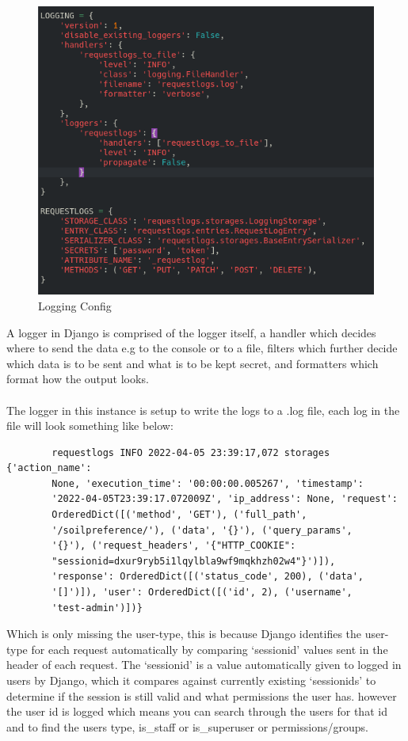 \documentclass{article}
\begin{document}
    \begin{figure}[!htb]
        \caption{Logging Config}
        \includegraphics{log3}
    \end{figure}

    A logger in Django is comprised of the logger itself, a handler which decides where to send the data e.g to the console or to a file, filters which further decide which data is to be sent and what is to be kept secret, and formatters which format how the output looks.
    \\
    \\
    The logger in this instance is setup to write the logs to a .log file,
    each log in the file will look something like below:
    
    \begin{verbatim}
        requestlogs INFO 2022-04-05 23:39:17,072 storages {'action_name':
        None, 'execution_time': '00:00:00.005267', 'timestamp':
        '2022-04-05T23:39:17.072009Z', 'ip_address': None, 'request':
        OrderedDict([('method', 'GET'), ('full_path',
        '/soilpreference/'), ('data', '{}'), ('query_params',
        '{}'), ('request_headers', '{"HTTP_COOKIE":
        "sessionid=dxur9ryb5i1lqylbla9wf9mqkhzh02w4"}')]),
        'response': OrderedDict([('status_code', 200), ('data',
        '[]')]), 'user': OrderedDict([('id', 2), ('username',
        'test-admin')])} 
    \end{verbatim}

    Which is only missing the user-type, this is because Django identifies the user-type for each request automatically by comparing `sessionid' values sent in the header of each request. The `sessionid' is a value automatically given to logged in users by Django, which it compares against currently existing `sessionids' to determine if the session is still valid and what permissions the user has. however the user id is logged which means you can search through the users for that id and to find the users type, is\_staff or is\_superuser or permissions/groups.
    
\end{document}
